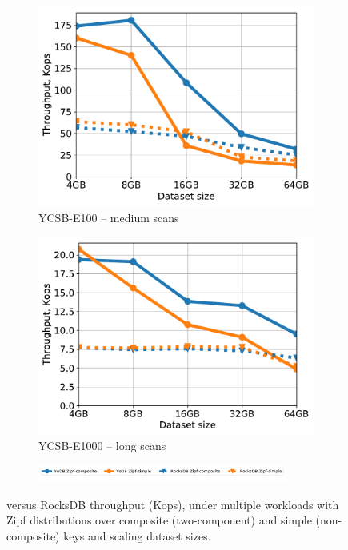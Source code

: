 \begin{figure}[tb]
\begin{subfigure}{0.33\linewidth}
\label{fig:throughput:e10}
\end{subfigure}
\begin{subfigure}{0.33\linewidth}
\includegraphics[width=\textwidth]{figs/Workload_E_line.pdf}
\caption{YCSB-E100 -- medium scans}
\label{fig:throughput:e100}
\end{subfigure}
\begin{subfigure}{0.33\linewidth}
\includegraphics[width=\textwidth]{figs/Workload_E+_line.pdf}
\caption{YCSB-E1000 -- long scans}
\label{fig:throughput:e1000}
\end{subfigure}
\begin{subfigure}{\linewidth}
\centerline{
\includegraphics[width=0.9\textwidth]{figs/legend.pdf}
\vspace{-5mm}
}
\end{subfigure}
\caption{
{\sys\/ versus RocksDB throughput (Kops), under multiple workloads with Zipf distributions over composite (two-component) and
simple (non-composite) keys and scaling dataset sizes.}
}
\label{fig:throughput}
\end{figure}


